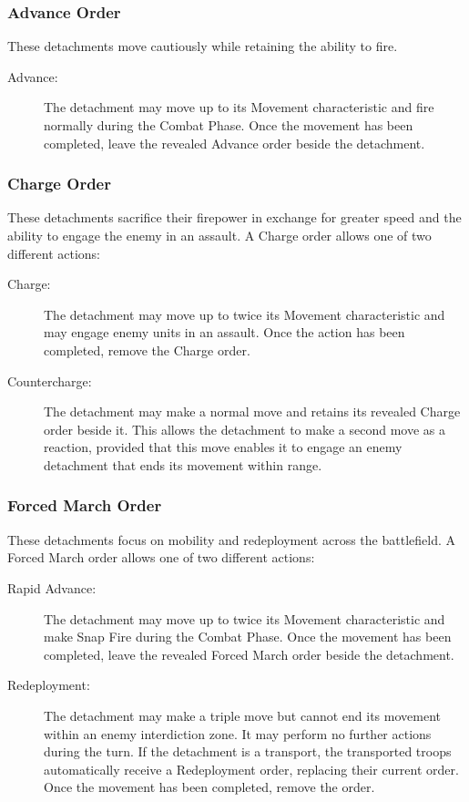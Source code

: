 \subsubsection{Advance Order}

These detachments move cautiously while retaining the ability to fire.

\begin{description}
    \item[Advance:] The detachment may move up to its Movement characteristic and fire normally during the Combat Phase. Once the movement has been completed, leave the revealed Advance order beside the detachment.
\end{description}

\subsubsection{Charge Order}

These detachments sacrifice their firepower in exchange for greater speed and the ability to engage the enemy in an assault. A Charge order allows one of two different actions:

\begin{description}
    \item[Charge:] The detachment may move up to twice its Movement characteristic and may engage enemy units in an assault. Once the action has been completed, remove the Charge order.

    \item[Countercharge:] The detachment may make a normal move and retains its revealed Charge order beside it. This allows the detachment to make a second move as a reaction, provided that this move enables it to engage an enemy detachment that ends its movement within range.
\end{description}

\subsubsection{Forced March Order}

These detachments focus on mobility and redeployment across the battlefield. A Forced March order allows one of two different actions:

\begin{description}
    \item[Rapid Advance:] The detachment may move up to twice its Movement characteristic and make Snap Fire during the Combat Phase. Once the movement has been completed, leave the revealed Forced March order beside the detachment.

    \item[Redeployment:] The detachment may make a triple move but cannot end its movement within an enemy interdiction zone. It may perform no further actions during the turn. If the detachment is a transport, the transported troops automatically receive a Redeployment order, replacing their current order. Once the movement has been completed, remove the order.
\end{description}

